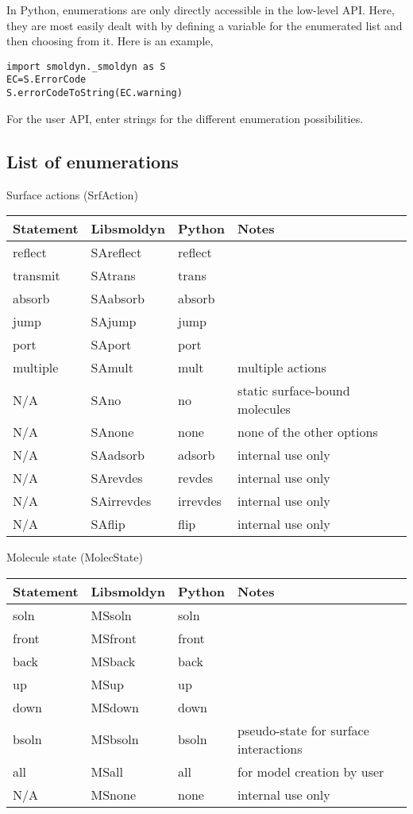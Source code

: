 \documentclass {scrbook}
\begin{document}
In Python, enumerations are only directly accessible in the low-level API. Here, they are most easily dealt with by defining a variable for the enumerated list and then choosing from it. Here is an example,
\begin{lstlisting}[style=SSAC]
import smoldyn._smoldyn as S
EC=S.ErrorCode
S.errorCodeToString(EC.warning)
\end{lstlisting}
For the user API, enter strings for the different enumeration possibilities.

\subsection*{List of enumerations}

Surface actions (SrfAction)
\begin{longtable}[c]{llll}
Statement & Libsmoldyn & Python & Notes\\
\hline
reflect & SAreflect & reflect\\
transmit & SAtrans & trans\\
absorb & SAabsorb & absorb\\
jump & SAjump & jump\\
port & SAport & port\\
multiple & SAmult & mult & multiple actions\\
N/A & SAno & no & static surface-bound molecules\\
N/A & SAnone & none & none of the other options\\
N/A & SAadsorb & adsorb & internal use only\\
N/A & SArevdes & revdes & internal use only\\
N/A & SAirrevdes & irrevdes & internal use only\\
N/A & SAflip & flip & internal use only
\end{longtable}

Molecule state (MolecState)
\begin{longtable}[c]{llll}
Statement & Libsmoldyn & Python & Notes\\
\hline
soln & MSsoln & soln\\
front & MSfront & front\\
back & MSback & back\\
up & MSup & up\\
down & MSdown & down\\
bsoln & MSbsoln & bsoln & pseudo-state for surface interactions\\
all & MSall & all & for model creation by user\\
N/A & MSnone & none & internal use only
\end{longtable}
\end{document}
